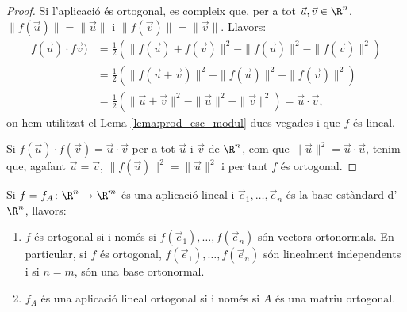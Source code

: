 \begin{proof}
Si l'aplicació és ortogonal, es compleix que, per a tot $\vec u,\vec v \in \R^n$, $\|f(\vec u)\|=\|\vec u\|$ i $\|f(\vec v)\|=\|\vec v\|$. Llavors:
\begin{align*}
    f(\vec u)\cdot f\vec v) & = \frac{1}{2}\left(\|f(\vec u) +f(\vec v)\|^2 - \|f(\vec u)\|^2 - \|f(\vec v)\|^2\right) \\
    & = \frac{1}{2}\left(\|f(\vec u+\vec v)\|^2 - \|f(\vec u)\|^2 - \|f(\vec v)\|^2\right) \\
     & = \frac{1}{2}\left(\|\vec u + \vec v\|^2 - \|\vec u\|^2 - \|\vec v\|^2\right) = \vec u \cdot \vec v  ,
\end{align*}
on hem utilitzat el Lema \ref{lema:prod_esc_modul} dues vegades i que $f$ és lineal.

Si $f(\vec u)\cdot f(\vec v)=\vec u \cdot \vec v$ per a tot $\vec u$ i $\vec v$ de $\R^n$, com que $\|\vec u\|^2=\vec u \cdot \vec u$, tenim que, agafant $\vec u=\vec v$, $\|f(\vec u)\|^2=\|\vec u\|^2$ i per tant $f$ és ortogonal.
\end{proof}
\begin{corollari}
Si $f = f_A \colon \R^n \to \R^m$ és una aplicació lineal i $\vec e_1, \dots, \vec e_n$ és la base estàndard d'$\R^n$, llavors:
\begin{enumerate}[\rm (a)]
    \item $f$ és ortogonal si i només si $f(\vec e_1), \dots, f(\vec e_n)$ són vectors ortonormals. En particular, si $f$ és ortogonal, $f(\vec e_1), \dots, f(\vec e_n)$ són linealment independents i si $n=m$, són una base ortonormal.
    \item $f_A$ és una aplicació lineal ortogonal si i només si $A$ és una matriu ortogonal.
\end{enumerate}
\end{corollari}
